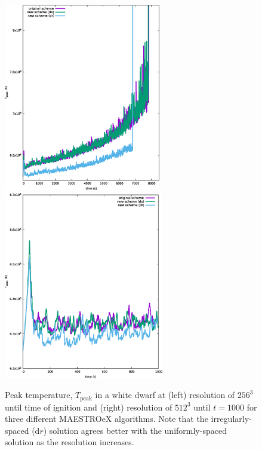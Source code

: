\begin{figure}[hbt]
\begin{center}
\includegraphics[width=2.7in]{./figs/wdconvect_256_maxT}  \hspace{0.5in}
\includegraphics[width=2.75in]{./figs/wdconvect_512_maxT}
\caption{\label{fig:wdconvect_Tmax} Peak temperature, $T_{\text{peak}}$  in a white dwarf at 
         (left) resolution of $256^3$ until time of ignition and (right) resolution of $512^3$ until $t=1000$ 
         for three different MAESTROeX algorithms. Note that the irregularly-spaced (d$r$) solution agrees better 
         with the uniformly-spaced solution as the resolution increases.}
\end{center}
\end{figure}


